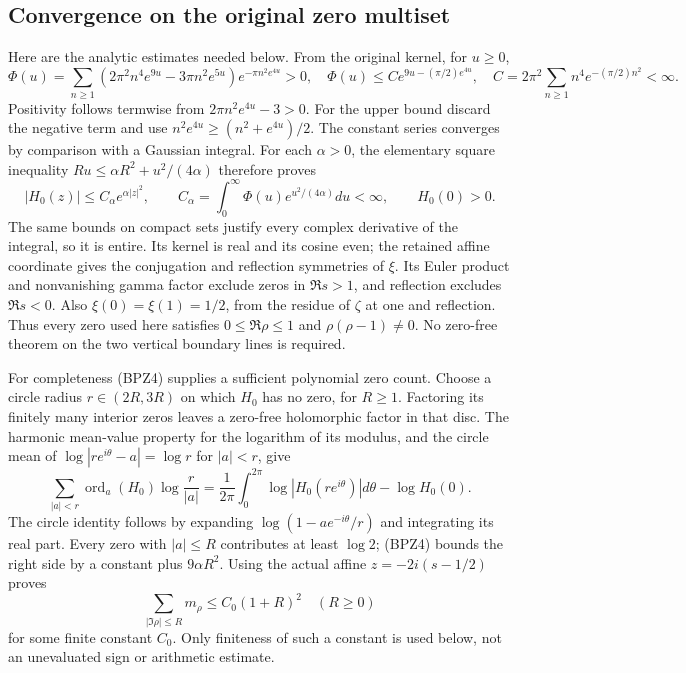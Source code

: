 \subsection{Convergence on the original zero multiset}

Here are the analytic estimates needed below. From the original kernel,
for $u\ge0$,
\begin{equation}\tag{BPZ3}
 \Phi(u)=\sum_{n\ge1}
 (2\pi^2n^4e^{9u}-3\pi n^2e^{5u})e^{-\pi n^2e^{4u}}>0,
 \quad
 \Phi(u)\le C e^{9u-(\pi/2)e^{4u}},
 \quad C=2\pi^2\sum_{n\ge1}n^4e^{-(\pi/2)n^2}<\infty.
\end{equation}
Positivity follows termwise from $2\pi n^2e^{4u}-3>0$.
For the upper bound discard the negative term and use
$n^2e^{4u}\ge(n^2+e^{4u})/2$. The constant series converges by comparison
with a Gaussian integral. For each $\alpha>0$, the elementary square
inequality $R u\le\alpha R^2+u^2/(4\alpha)$ therefore proves
\begin{equation}\tag{BPZ4}
 |H_0(z)|\le C_\alpha e^{\alpha|z|^2},\qquad
 C_\alpha=\int_0^\infty\Phi(u)e^{u^2/(4\alpha)}du<\infty,
 \qquad H_0(0)>0.
\end{equation}
The same bounds on compact sets justify every complex derivative of
the integral, so it is entire. Its kernel is real and its cosine even;
the retained affine coordinate gives the conjugation and reflection
symmetries of $\xi$. Its Euler product and nonvanishing gamma factor
exclude zeros in $\Re s>1$, and reflection excludes $\Re s<0$.
Also $\xi(0)=\xi(1)=1/2$, from the residue of $\zeta$ at one and
reflection. Thus every zero used here satisfies
$0\le\Re\rho\le1$ and $\rho(\rho-1)\ne0$.
No zero-free theorem on the two vertical boundary lines is required.

For completeness (BPZ4) supplies a sufficient polynomial zero count.
Choose a circle radius $r\in(2R,3R)$ on which $H_0$ has no zero, for
$R\ge1$. Factoring its finitely many interior zeros leaves a zero-free
holomorphic factor in that disc. The harmonic mean-value property for
the logarithm of its modulus, and
the circle mean of $\log|re^{i\theta}-a|=\log r$ for $|a|<r$, give
\[
 \sum_{|a|<r}\operatorname{ord}_a(H_0)\log\frac r{|a|}
 =\frac1{2\pi}\int_0^{2\pi}\log|H_0(re^{i\theta})|d\theta
   -\log H_0(0).
\]
The circle identity follows by expanding
$\log(1-ae^{-i\theta}/r)$ and integrating its real part.
Every zero with $|a|\le R$ contributes at least $\log2$; (BPZ4)
bounds the right side by a constant plus $9\alpha R^2$.
Using the actual affine $z=-2i(s-1/2)$ proves
\begin{equation}\tag{BPZ5}
 \sum_{|\Im\rho|\le R}m_\rho\le C_0(1+R)^2
 \quad(R\ge0)
\end{equation}
for some finite constant $C_0$. Only finiteness of such a constant is
used below, not an unevaluated sign or arithmetic estimate.

